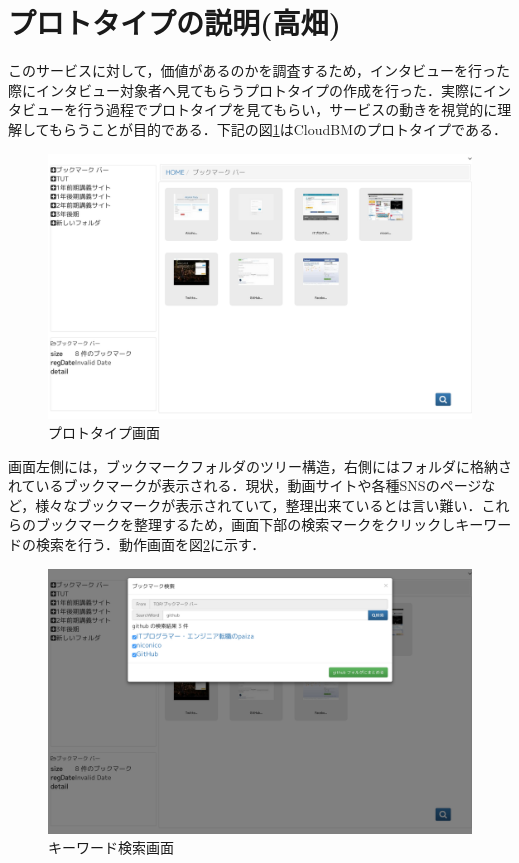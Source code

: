 \documentclass[a4paper,10pt,fleqn]{jsarticle}
\begin{document}
\section{プロトタイプの説明(高畑)}
このサービスに対して，価値があるのかを調査するため，インタビューを行った際にインタビュー対象者へ見てもらうプロトタイプの作成を行った．実際にインタビューを行う過程でプロトタイプを見てもらい，サービスの動きを視覚的に理解してもらうことが目的である．下記の図\ref{fig:prot1}はCloudBMのプロトタイプである．

\begin{figure}[h]
  \begin{center}
    \includegraphics[width=14.0cm]{./prot1.png}
    \caption{プロトタイプ画面} 
    \label{fig:prot1}
  \end{center}
\end{figure}

画面左側には，ブックマークフォルダのツリー構造，右側にはフォルダに格納されているブックマークが表示される．現状，動画サイトや各種SNSのページなど，様々なブックマークが表示されていて，整理出来ているとは言い難い．これらのブックマークを整理するため，画面下部の検索マークをクリックしキーワードの検索を行う．動作画面を図\ref{fig:prot2}に示す．

\begin{figure}[h]
  \begin{center}
    \includegraphics[width=14.0cm]{./prot2.png}
    \caption{キーワード検索画面} 
    \label{fig:prot2}
  \end{center}
\end{figure}
\end{document}

